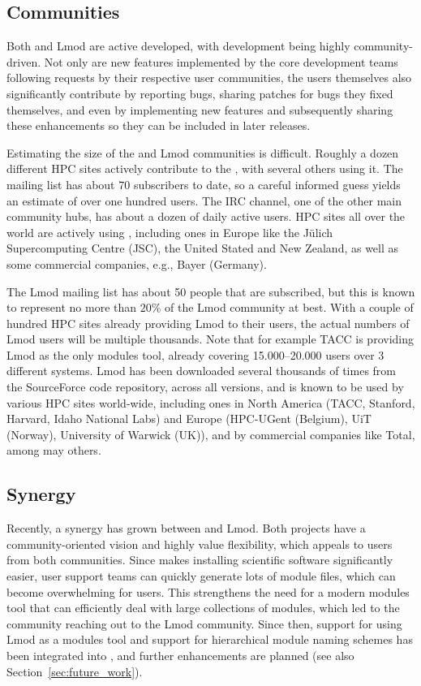 \subsection{Communities}
\label{sec:communities}

Both \easybuild{} and Lmod are active developed, with development being
highly community-driven. Not only are new features implemented by the core
development teams following requests by their respective user communities, the
users themselves also significantly contribute by reporting bugs, sharing patches
for bugs they fixed themselves, and even by implementing new features
and subsequently sharing these enhancements so they can be included in later
releases.

Estimating the size of the \easybuild{} and Lmod communities is difficult.
Roughly a dozen different HPC sites actively contribute to the \easybuild{}, with
several others using it. The \easybuild{} mailing list has about 70 subscribers
to date, so a careful informed guess yields an estimate of over one hundred
users. The \easybuild{} IRC channel, one of the other main community hubs, has
about a dozen of daily active users. HPC sites all over the world are
actively using \easybuild{}, including ones in Europe like the
J\"ulich Supercomputing Centre (JSC), the United Stated and
New Zealand, as well as some commercial companies, e.g., Bayer (Germany).

The Lmod mailing list has about 50 people that are subscribed, but this
is known to represent no more than $20\%$ of the Lmod community at best. With a
couple of hundred HPC sites already providing Lmod to their users, the actual
numbers of Lmod users will be multiple thousands. Note that for example TACC is
providing Lmod as the only modules tool, already covering 15.000--20.000 users
over 3 different systems. Lmod has been downloaded several thousands of times
from the SourceForce code repository, across all versions, and is known to be
used by various HPC sites world-wide, including ones in North America (TACC,
Stanford, Harvard, Idaho National Labs) and Europe (HPC-UGent (Belgium), UiT (Norway),
University of Warwick (UK)), and by commercial companies like Total, among may others.

\subsection{Synergy}

Recently, a synergy has grown between \easybuild{} and Lmod. Both projects have a
community-oriented vision and highly value flexibility, which appeals to users
from both communities. Since \easybuild{} makes installing scientific software
significantly easier, user support teams can quickly generate lots of module
files, which can become overwhelming for users. This strengthens the need for a
modern modules tool that can efficiently deal with large collections of modules,
which led to the \easybuild{} community reaching out to the Lmod community.
Since then, support for using Lmod as a modules tool and support for hierarchical
module naming schemes has been integrated into \easybuild{}, and further
enhancements are planned (see also Section~\ref{sec:future_work}).

